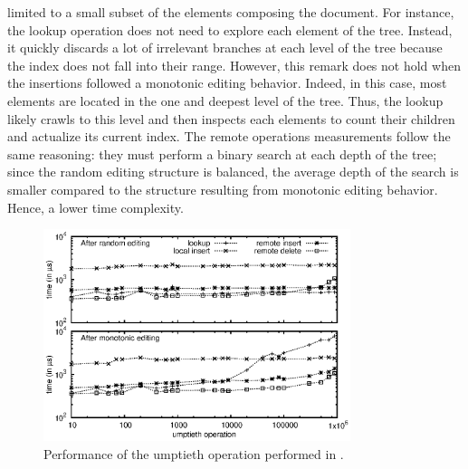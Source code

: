 \begin{asparadesc}
  limited to a small subset of the elements composing the document. For
  instance, the lookup operation does not need to explore each element of the
  tree. Instead, it quickly discards a lot of irrelevant branches at each level
  of the tree because the index does not fall into their range. However, this
  remark does not hold when the insertions followed a monotonic editing
  behavior. Indeed, in this case, most elements are located in the one and
  deepest level of the tree. Thus, the lookup likely crawls to this level and
  then inspects each elements to count their children and actualize its current
  index. The remote operations measurements follow the same reasoning: they must
  perform a binary search at each depth of the tree; since the random editing
  structure is balanced, the average depth of the search is smaller compared to
  the structure resulting from monotonic editing behavior. Hence, a lower time
  complexity.
\end{asparadesc}

\begin{figure}
  \centering
  \includegraphics[width=0.8\textwidth]{./img/time.eps}
  \caption{\label{fig:time} Performance of the umptieth operation performed in
    \LSEQ.}
\end{figure}




